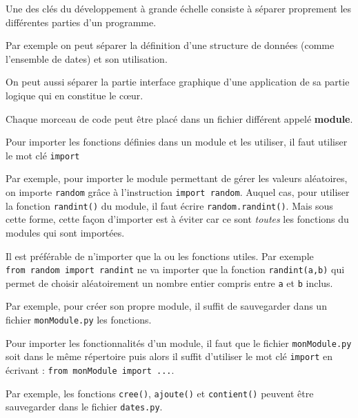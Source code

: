 \documentclass[a4paper,17pt]{extarticle}
\begin{document}
    Une des clés du développement à grande échelle consiste à séparer
proprement les différentes parties d'un programme.
\begin{exemple}
    Par exemple on peut séparer la définition d'une structure de données
(comme l'ensemble de dates) et son utilisation.

On peut aussi séparer la partie interface graphique d'une application de
sa partie logique qui en constitue le cœur.

        \end{exemple}\begin{retenir}
    Chaque morceau de code peut être placé dans un fichier différent appelé
\textbf{module}.

Pour importer les fonctions définies dans un module et les utiliser, il
faut utiliser le mot clé \texttt{import}

        \end{retenir}\begin{exemple}
    Par exemple, pour importer le module permettant de gérer les valeurs
aléatoires, on importe \texttt{random} grâce à l'instruction
\texttt{import\ random}. Auquel cas, pour utiliser la fonction
\texttt{randint()} du module, il faut écrire \texttt{random.randint()}.
Mais sous cette forme, cette façon d'importer est à éviter car ce sont
\emph{toutes} les fonctions du modules qui sont importées.

Il est préférable de n'importer que la ou les fonctions utiles. Par
exemple \texttt{from\ random\ import\ randint} ne va importer que la
fonction \texttt{randint(a,b)} qui permet de choisir aléatoirement un
nombre entier compris entre \texttt{a} et \texttt{b} inclus.

        \end{exemple}\begin{exemple}
    Par exemple, pour créer son propre module, il suffit de sauvegarder dans
un fichier \texttt{monModule.py} les fonctions.

Pour importer les fonctionnalités d'un module, il faut que le fichier
\texttt{monModule.py} soit dans le même répertoire puis alors il suffit
d'utiliser le mot clé \texttt{import} en écrivant :
\texttt{from\ monModule\ import\ ...}.

        \end{exemple}\begin{exemple}
    Par exemple, les fonctions \texttt{cree()}, \texttt{ajoute()} et
\texttt{contient()} peuvent être sauvegarder dans le fichier
\texttt{dates.py}.


\end{exemple}
\end{document}
